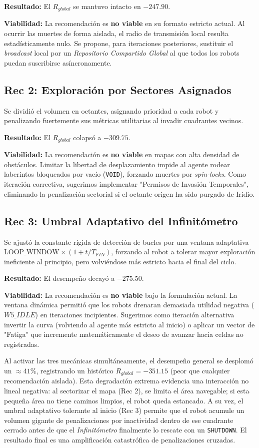 \documentclass[conference]{IEEEtran}
\begin{document}
\textbf{Resultado:} El $R_{global}$ se mantuvo intacto en $-247.90$. 

\textbf{Viabilidad:} La recomendación es \textbf{no viable} en su formato estricto actual. Al ocurrir las muertes de forma aislada, el radio de transmisión local resulta estadísticamente nulo. Se propone, para iteraciones posteriores, sustituir el \textit{broadcast} local por un \textit{Repositorio Compartido Global} al que todos los robots puedan suscribirse asíncronamente.

\subsection{Rec 2: Exploración por Sectores Asignados}
Se dividió el volumen en octantes, asignando prioridad a cada robot y penalizando fuertemente sus métricas utilitarias al invadir cuadrantes vecinos.

\textbf{Resultado:} El $R_{global}$ colapsó a $-309.75$. 

\textbf{Viabilidad:} La recomendación es \textbf{no viable} en mapas con alta densidad de obstáculos. Limitar la libertad de desplazamiento impide al agente rodear laberintos bloqueados por vacío (\texttt{VOID}), forzando muertes por \textit{spin-locks}. Como iteración correctiva, sugerimos implementar "Permisos de Invasión Temporales", eliminando la penalización sectorial si el octante origen ha sido purgado de Iridio.

\subsection{Rec 3: Umbral Adaptativo del Infinitómetro}
Se ajustó la constante rígida de detección de bucles por una ventana adaptativa $\text{LOOP\_WINDOW} \times (1 + t / T_{FIN})$, forzando al robot a tolerar mayor exploración ineficiente al principio, pero volviéndose más estricto hacia el final del ciclo.

\textbf{Resultado:} El desempeño decayó a $-275.50$. 

\textbf{Viabilidad:} La recomendación es \textbf{no viable} bajo la formulación actual. La ventana dinámica permitió que los robots drenaran demasiada utilidad negativa ($W5\_IDLE$) en iteraciones incipientes. Sugerimos como iteración alternativa invertir la curva (volviendo al agente más estricto al inicio) o aplicar un vector de "Fatiga" que incremente matemáticamente el deseo de avanzar hacia celdas no registradas.

Al activar las tres mecánicas simultáneamente, el desempeño general se desplomó un $\approx 41\%$, registrando un histórico $R_{global} = -351.15$ (peor que cualquier recomendación aislada). Esta degradación extrema evidencia una interacción no lineal negativa: al sectorizar el mapa (Rec 2), se limita el área navegable; si esta pequeña área no tiene caminos limpios, el robot queda estancado. A su vez, el umbral adaptativo tolerante al inicio (Rec 3) permite que el robot acumule un volumen gigante de penalizaciones por inactividad dentro de ese cuadrante cerrado antes de que el \textit{Infinitómetro} finalmente lo rescate con un \texttt{SHUTDOWN}. El resultado final es una amplificación catastrófica de penalizaciones cruzadas. 
\end{document}
